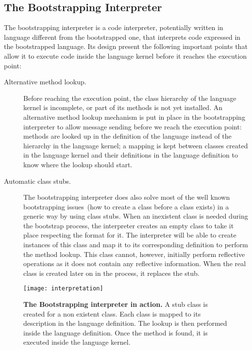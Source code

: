 \subsection{The Bootstrapping Interpreter}\label{sec:ast_interpreter}

The bootstrapping interpreter is a code interpreter, potentially written in language different from the bootstrapped one, that interprets code expressed in the bootstrapped language. Its design present the following important points that allow it to execute code inside the language kernel before it reaches the execution point:

\begin{description}
\item[Alternative method lookup.] Before reaching the execution point, the class hierarchy of the language kernel is incomplete, or part of its methods is not yet installed. An alternative method lookup mechanism is put in place in the bootstrapping interpreter to allow message sending before we reach the execution point: methods are looked up in the definition of the language instead of the hierarchy in the language kernel; a mapping is kept between classes created in the language kernel and their definitions in the language definition to know where the lookup should start.

\item[Automatic class stubs.] The bootstrapping interpreter does also solve most of the well known bootstrapping issues~(\eg how to create a class before a class exists) in a generic way by using class stubs. When an inexistent class is needed during the bootstrap process, the interpreter creates an empty class to take it place respecting the \VM format for it. The interpreter will be able to create instances of this class and map it to its corresponding definition to perform the method lookup. This class cannot, however, initially perform reflective operations as it does not contain any reflective information. When the real class is created later on in the process, it replaces the stub.

\end{description}

\begin{figure}[!ht]
\center
\texttt{[image: interpretation]}
\caption{\textbf{The Bootstrapping interpreter in action.} A stub class is created for a non existent class. Each class is mapped to its description in the language definition. The lookup is then performed inside the language definition. Once the method is found, it is executed inside the language kernel.\label{fig:interpretation}}
\end{figure}

